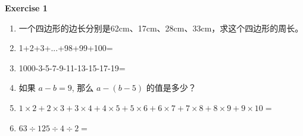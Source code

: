 \documentclass[12pt]{article}
\begin{document}
\textbf{Exercise 1}
\begin{enumerate}
    \item 一个四边形的边长分别是62cm、17cm、28cm、33cm，求这个四边形的周长。
    \item 1+2+3+...+98+99+100=
    \item 1000-3-5-7-9-11-13-15-17-19=
    \item 如果 $a - b = 9$, 那么 $a - (b-5)$ 的值是多少？
    \item  $ 1\times 2 + 2\times 3 + 3\times 4 + 4\times 5 + 5\times 6 + 6\times 7 + 7\times 8 + 8\times 9 + 9\times 10 = $
    \item $63\div 125 \div 4 \div 2 = $
\end{enumerate}
\end{document}
